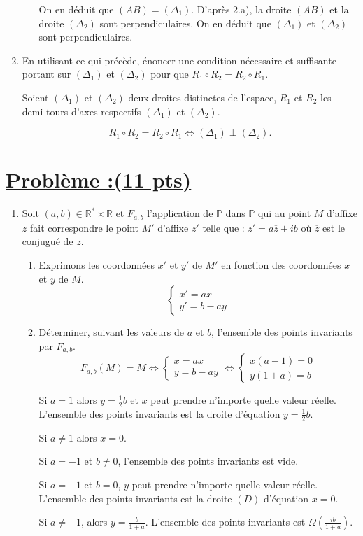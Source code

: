 \documentclass[12pt,a4paper]{article}
\begin{document}
\begin{enumerate}
\begin{enumerate}
			On en déduit que $(AB) = (\Delta_1)$. D’après 2.a), la droite $(AB)$ et la droite $(\Delta_2)$ sont perpendiculaires. On en déduit que $(\Delta_1)$ et $(\Delta_2)$ sont perpendiculaires.
		\end{enumerate}
\item En utilisant ce qui précède, énoncer une condition nécessaire et suffisante portant sur $(\Delta_1)$ et $(\Delta_2)$ pour que $R_1 \circ R_2 = R_2 \circ R_1$.

Soient $(\Delta_1)$ et $(\Delta_2)$ deux droites distinctes de l’espace, $R_1$ et $R_2$ les demi-tours d’axes respectifs $(\Delta_1)$ et $(\Delta_2)$.

\[ R_1 \circ R_2 = R_2 \circ R_1 \iff (\Delta_1) \perp (\Delta_2). \]
\end{enumerate}

\section*{\underline{Problème :(11 pts)}}
\begin{enumerate}
\item Soit $(a, b) \in \mathbb{R}^* \times \mathbb{R}$ et $F_{a,b}$ l’application de $\mathbb{P}$ dans $\mathbb{P}$ qui au point $M$ d’affixe $z$ fait correspondre le point $M'$ d’affixe $z'$ telle que : $z' = a \overline{z} + ib$ où $\overline{z}$ est le conjugué de $z$.
\begin{enumerate}
\item Exprimons les coordonnées $x'$ et $y'$ de $M'$ en fonction des coordonnées $x$ et $y$ de $M$.
\[
\begin{cases}
x' = a x \\
y' = b - a y
\end{cases}
\]
\item Déterminer, suivant les valeurs de $a$ et $b$, l’ensemble des points invariants par $F_{a,b}$.
\[ F_{a,b}(M) = M \Leftrightarrow 
\begin{cases} 
x = a x \\ 
y = b - a y 
\end{cases}
\Leftrightarrow 
\begin{cases} 
x(a - 1) = 0 \\ 
y(1 + a) = b 
\end{cases} \]

     Si $a = 1$ alors $y = \frac{1}{2} b$ et $x$ peut prendre n’importe quelle valeur réelle. L’ensemble des points invariants est la droite d’équation $y = \frac{1}{2} b$.
     
     Si $a \neq 1$ alors $x = 0$.
    
         Si $a = -1$ et $b \neq 0$, l’ensemble des points invariants est vide.
         
         Si $a = -1$ et $b = 0$, $y$ peut prendre n’importe quelle valeur réelle. L’ensemble des points invariants est la droite $(D)$ d’équation $x = 0$.
         
         Si $a \neq -1$, alors $y = \frac{b}{1 + a}$. L’ensemble des points invariants est $\Omega \left( \frac{ib}{1 + a} \right)$.
\end{enumerate}
\end{enumerate}
\end{document}

